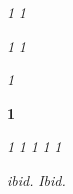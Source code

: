 \usepackage{soul}  %

\let\booktitle\textit
\soulregister\booktitle{1}
\let\book\textit
\soulregister\book{1}

\let\journaltitle\textit
\soulregister\journaltitle{1}
\let\journal\textit
\soulregister\journal{1}

\let\newspaper\textit
\soulregister\newspaper{1}

\let\vol\textbf
\soulregister\vol{1}  %

\let\latin\textit
\soulregister\latin{1}  
\let\french\textit
\soulregister\french{1}
\let\greek\textit
\soulregister\greek{1}
\let\german\textit
\soulregister\german{1}
\let\italian\textit
\soulregister\italian{1}


\newcommand{\ibid}{\textit{ibid.}\xspace}  %
\soulregister\ibid{}
\newcommand{\Ibid}{\textit{Ibid.}\xspace}  %
\soulregister\Ibid{}
